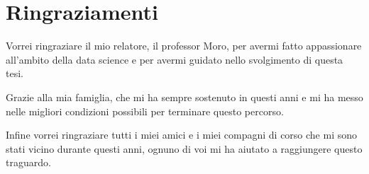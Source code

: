 \documentclass[12pt,a4paper,twoside,openright]{book}
\begin{document}
\chapter*{Ringraziamenti}

Vorrei ringraziare il mio relatore, il professor Moro, per avermi fatto appassionare all’ambito della data science e per avermi guidato nello svolgimento di questa tesi.

Grazie alla mia famiglia, che mi ha sempre sostenuto in questi anni e mi ha messo nelle migliori condizioni possibili per terminare questo percorso.


Infine vorrei ringraziare tutti i miei amici e i miei compagni di corso che mi sono stati vicino durante questi anni, ognuno di voi mi ha aiutato a raggiungere questo traguardo.
	
\backmatter	
{}


\end{document}
